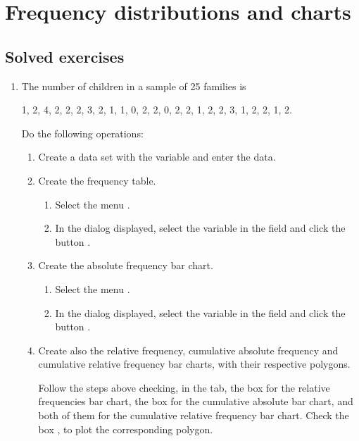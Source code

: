 
\chapter{Frequency distributions and charts}\label{cha:freqency-distributions}

\section{Solved exercises}
\begin{enumerate}[leftmargin=*]

\item The number of children in a sample of 25 families is
\begin{center}
1, 2, 4, 2, 2, 2, 3, 2, 1, 1, 0, 2, 2, 0, 2, 2, 1, 2, 2, 3, 1, 2, 2, 1, 2.
\end{center}
Do the following operations:
\begin{enumerate}
\item Create a data set with the variable  and enter the data.

\item Create the frequency table.
\begin{indication}
\begin{enumerate}
\item Select the menu  .
\item In the dialog displayed, select the variable  in the field  and
click the button .
\end{enumerate}
\end{indication}

\item Create the absolute frequency bar chart.
\begin{indication}
\begin{enumerate}
\item Select the menu .
\item In the dialog displayed, select the variable  in the field  and click
the button .
\end{enumerate}
\end{indication}

\item Create also the relative frequency, cumulative absolute frequency and cumulative relative frequency bar charts,
with their respective polygons.
\begin{indication}Follow the steps above checking, in the  tab, the box
 for the relative frequencies bar chart, the box  for the cumulative absolute bar chart, and both of them for the cumulative relative frequency bar chart. 
Check the box , to plot the corresponding polygon. 
\end{indication}
\end{enumerate}


\end{enumerate}
